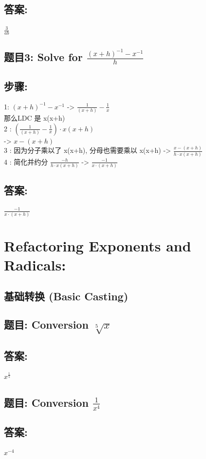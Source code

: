 \documentclass[12pt]{article}
\begin{document}
\subsection*{答案:}
$\frac{3}{ab}$ 

\subsection*{题目3: Solve for  $\frac{(x+h)^{-1} - x^{-1}}{h}$}
\subsection*{步骤:}
1: $(x+h)^{-1} - x^{-1}$ ->  $\frac{1}{(x+h)} - \frac{1}{x}$ \\
那么LDC 是 x(x+h) \\
2 : $(\frac{1}{(x+h)} - \frac{1}{x}) \cdot x(x+h)$ \\ -> $x- (x+ h)$ \\
3 : 因为分子乘以了 x(x+h), 分母也需要乘以 x(x+h) ->  $\frac{x - (x+h)}{h \cdot x(x+h)}$ \\
4 : 简化并约分 $\frac{-h} {h \cdot x(x+h)}$  ->  $\frac{-1}{x \cdot(x+h)}$

\subsection*{答案:}
$\frac{-1}{x \cdot(x+h)}$ 


\section{Refactoring Exponents and Radicals:} 

\subsection*{基础转换 (Basic Casting)}

\subsection*{题目: Conversion  $\sqrt[5]{x}$}
\subsection*{答案:}
$x^\frac{1}{5}$


\subsection*{题目: Conversion  $\frac{1}{x^4}$}
\subsection*{答案:}
$x^{-4}$
\end{document}
